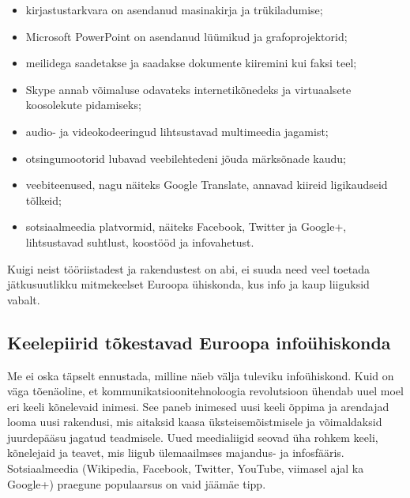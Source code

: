 \begin{multicols}{2}
\begin{itemize}
\item kirjastustarkvara on asendanud masi\-na\-kirja ja trükiladumise;
      \item Microsoft PowerPoint on asendanud lüümikud ja grafoprojektorid;
      \item meilidega saadetakse ja saadakse dokumente kiiremini kui faksi teel;
      \item Skype annab võimaluse odavateks internetikõnedeks ja virtuaalsete koosolekute pidamiseks;
      \item audio- ja videokodeeringud lihtsustavad multimeedia jagamist;
      \item otsingumootorid lubavad veebilehtedeni jõuda märksõnade kaudu;
      \item veebiteenused, nagu näiteks Google Translate, annavad kiireid ligikaudseid tõlkeid;
      \item sotsiaalmeedia platvormid, näiteks Facebook, Twitter ja Google+, lihtsustavad suhtlust, koostööd ja infovahetust.
\end{itemize}

Kuigi neist tööriistadest ja rakendustest on abi, ei suuda need veel toetada jätku\-suutlikku mitmekeelset Euroopa ühiskonda, kus info ja kaup liiguksid vabalt.

\subsection{Keelepiirid tõkestavad Euroopa infoühiskonda}
  
Me ei oska täpselt ennustada, milline näeb välja tuleviku infoühiskond. 
Kuid on väga tõenäoline, et kommunikatsioonitehno\-loogia revolutsioon ühendab uuel moel eri keeli kõnelevaid inimesi. 
See paneb ini\-mesed uusi keeli õppima ja arendajad looma uusi rakendusi, mis aitaksid kaasa üks\-teisemõistmisele ja võimaldaksid juurdepääsu jagatud teadmisele. 
Uued meedia\-liigid seovad üha rohkem keeli, kõnelejaid ja teavet, mis liigub ülemaailmses majandus- ja infosfääris. 
Sotsiaalmeedia (Wikipedia, Facebook, Twitter, YouTube, viimasel ajal ka Google+) praegune popu\-laarsus on vaid jäämäe tipp.




\end{multicols}
